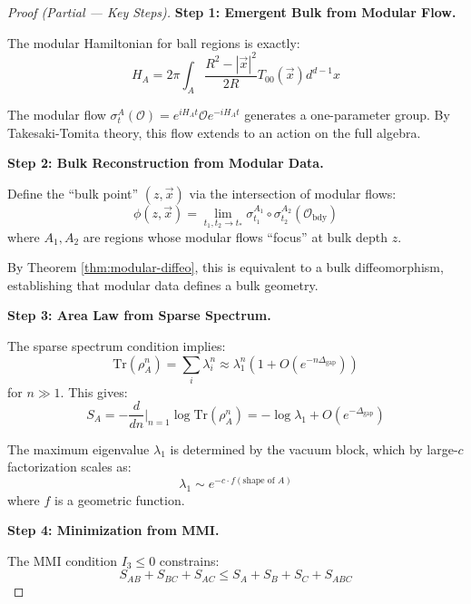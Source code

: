 \documentclass[12pt,a4paper]{article}
\begin{document}
\begin{proof}[Proof (Partial --- Key Steps)]
\textbf{Step 1: Emergent Bulk from Modular Flow.}

The modular Hamiltonian for ball regions is exactly:
\begin{equation}
H_A = 2\pi \int_A \frac{R^2 - |\vec{x}|^2}{2R} T_{00}(\vec{x}) d^{d-1}x
\end{equation}

The modular flow $\sigma_t^A(\mathcal{O}) = e^{iH_A t} \mathcal{O} e^{-iH_A t}$ generates a one-parameter group. By Takesaki-Tomita theory, this flow extends to an action on the full algebra.

\textbf{Step 2: Bulk Reconstruction from Modular Data.}

Define the ``bulk point'' $(z, \vec{x})$ via the intersection of modular flows:
\begin{equation}
\phi(z, \vec{x}) = \lim_{t_1, t_2 \to t_*} \sigma_{t_1}^{A_1} \circ \sigma_{t_2}^{A_2}(\mathcal{O}_{\text{bdy}})
\end{equation}
where $A_1, A_2$ are regions whose modular flows ``focus'' at bulk depth $z$.

By Theorem \ref{thm:modular-diffeo}, this is equivalent to a bulk diffeomorphism, establishing that modular data defines a bulk geometry.

\textbf{Step 3: Area Law from Sparse Spectrum.}

The sparse spectrum condition implies:
\begin{equation}
\text{Tr}(\rho_A^n) = \sum_i \lambda_i^n \approx \lambda_1^n \left( 1 + O(e^{-n\Delta_{\text{gap}}}) \right)
\end{equation}
for $n \gg 1$. This gives:
\begin{equation}
S_A = -\frac{d}{dn}\Big|_{n=1} \log\text{Tr}(\rho_A^n) = -\log\lambda_1 + O(e^{-\Delta_{\text{gap}}})
\end{equation}

The maximum eigenvalue $\lambda_1$ is determined by the vacuum block, which by large-$c$ factorization scales as:
\begin{equation}
\lambda_1 \sim e^{-c \cdot f(\text{shape of }A)}
\end{equation}
where $f$ is a geometric function.

\textbf{Step 4: Minimization from MMI.}

The MMI condition $I_3 \leq 0$ constrains:
\begin{equation}
S_{AB} + S_{BC} + S_{AC} \leq S_A + S_B + S_C + S_{ABC}
\end{equation}


\end{proof}
\end{document}
